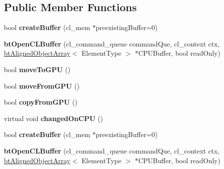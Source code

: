 \subsection*{Public Member Functions}
\begin{DoxyCompactItemize}
\item 
\mbox{\label{classbtOpenCLBuffer_ae5f7046b92895b4e767212bba4fcd0af}} 
bool {\bfseries create\+Buffer} (cl\+\_\+mem $\ast$preexisting\+Buffer=0)
\item 
\mbox{\label{classbtOpenCLBuffer_a714422d0a62a01d28d6d0115ca6650c2}} 
{\bfseries bt\+Open\+C\+L\+Buffer} (cl\+\_\+command\+\_\+queue command\+Que, cl\+\_\+context ctx, \hyperlink{classbtAlignedObjectArray}{bt\+Aligned\+Object\+Array}$<$ Element\+Type $>$ $\ast$C\+P\+U\+Buffer, bool read\+Only)
\item 
\mbox{\label{classbtOpenCLBuffer_a29a7ebd5406bebd2eaa3de3380c3907a}} 
bool {\bfseries move\+To\+G\+PU} ()
\item 
\mbox{\label{classbtOpenCLBuffer_a6555ee5c3a3d6e6d638590923cf9cbbf}} 
bool {\bfseries move\+From\+G\+PU} ()
\item 
\mbox{\label{classbtOpenCLBuffer_a88a86a86827389c4b9dcd2e2ff441875}} 
bool {\bfseries copy\+From\+G\+PU} ()
\item 
\mbox{\label{classbtOpenCLBuffer_a2eda55c719099ee8751625283e47b638}} 
virtual void {\bfseries changed\+On\+C\+PU} ()
\item 
\mbox{\label{classbtOpenCLBuffer_ae5f7046b92895b4e767212bba4fcd0af}} 
bool {\bfseries create\+Buffer} (cl\+\_\+mem $\ast$preexisting\+Buffer=0)
\item 
\mbox{\label{classbtOpenCLBuffer_a714422d0a62a01d28d6d0115ca6650c2}} 
{\bfseries bt\+Open\+C\+L\+Buffer} (cl\+\_\+command\+\_\+queue command\+Que, cl\+\_\+context ctx, \hyperlink{classbtAlignedObjectArray}{bt\+Aligned\+Object\+Array}$<$ Element\+Type $>$ $\ast$C\+P\+U\+Buffer, bool read\+Only)
\item 
\mbox{\label{classbtOpenCLBuffer_a29a7ebd5406bebd2eaa3de3380c3907a}} 

\end{DoxyCompactItemize}

